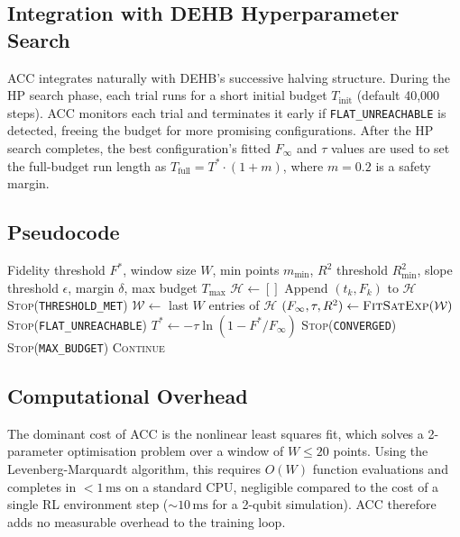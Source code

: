 \subsection{Integration with DEHB Hyperparameter Search}

ACC integrates naturally with DEHB's successive halving structure. During the HP search
phase, each trial runs for a short initial budget $T_{\mathrm{init}}$ (default 40,000
steps). ACC monitors each trial and terminates it early if \texttt{FLAT\_UNREACHABLE}
is detected, freeing the budget for more promising configurations. After the HP search
completes, the best configuration's fitted $F_\infty$ and $\tau$ values are used to
set the full-budget run length as $T_{\mathrm{full}} = T^* \cdot (1 + m)$, where
$m = 0.2$ is a safety margin.

\subsection{Pseudocode}

\begin{algorithm}[t]
\caption{Adaptive Convergence Controller (ACC)}
\label{alg:acc}
\begin{algorithmic}[1]
\Require Fidelity threshold $F^*$, window size $W$, min points $m_{\min}$,
         $R^2$ threshold $R^2_{\min}$, slope threshold $\epsilon$,
         margin $\delta$, max budget $T_{\max}$
\State $\mathcal{H} \leftarrow []$ 
  \State Append $(t_k, F_k)$ to $\mathcal{H}$
    \Return \textsc{Stop}(\texttt{THRESHOLD\_MET})
  \EndIf
  \State $\mathcal{W} \leftarrow$ last $W$ entries of $\mathcal{H}$
    \State $(F_\infty, \tau, R^2) \leftarrow \textsc{FitSatExp}(\mathcal{W})$
        \Return \textsc{Stop}(\texttt{FLAT\_UNREACHABLE})
      \EndIf
      \State $T^* \leftarrow -\tau \ln(1 - F^*/F_\infty)$ 
        \Return \textsc{Stop}(\texttt{CONVERGED})
      \EndIf
    \EndIf
  \EndIf
    \Return \textsc{Stop}(\texttt{MAX\_BUDGET})
  \EndIf
  \State \Return \textsc{Continue}
\EndFor
\end{algorithmic}
\end{algorithm}

\subsection{Computational Overhead}

The dominant cost of ACC is the nonlinear least squares fit, which solves a
2-parameter optimisation problem over a window of $W \leq 20$ points. Using
the Levenberg-Marquardt algorithm, this requires $O(W)$ function evaluations
and completes in $< 1\,\mathrm{ms}$ on a standard CPU, negligible compared to
the cost of a single RL environment step ($\sim 10\,\mathrm{ms}$ for a 2-qubit
simulation). ACC therefore adds no measurable overhead to the training loop.
